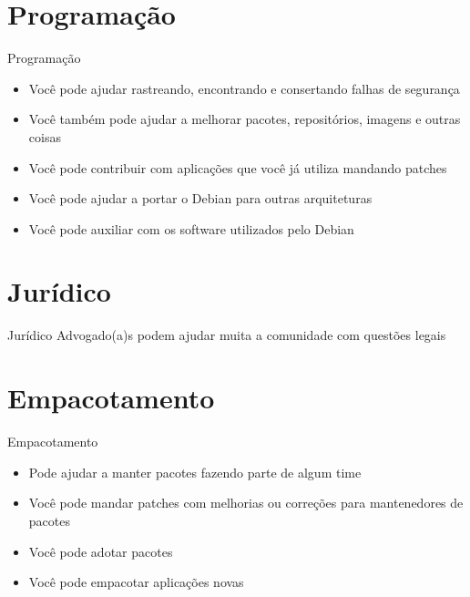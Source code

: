 \documentclass[10pt, compress, aspectratio=169]{beamer}
\begin{document}
\section{Programação}

\begin{frame}{Programação}
  \begin{itemize}
    \item Você pode ajudar rastreando, encontrando e consertando falhas de
          segurança
    \item Você também pode ajudar a melhorar pacotes, repositórios, imagens e
          outras coisas
    \item Você pode contribuir com aplicações que você já utiliza mandando
          patches
    \item Você pode ajudar a portar o Debian para outras arquiteturas
    \item Você pode auxiliar com os software utilizados pelo Debian
  \end{itemize}
\end{frame}

\section{Jurídico}

\begin{frame}{Jurídico}
  Advogado(a)s podem ajudar muita a comunidade com questões legais
\end{frame}

\section{Empacotamento}

\begin{frame}{Empacotamento}
  \begin{itemize}
    \item Pode ajudar a manter pacotes fazendo parte de algum time
    \item Você pode mandar patches com melhorias ou correções para mantenedores
          de pacotes
    \item Você pode adotar pacotes
    \item Você pode empacotar aplicações novas
  \end{itemize}
\end{frame}
\end{document}

